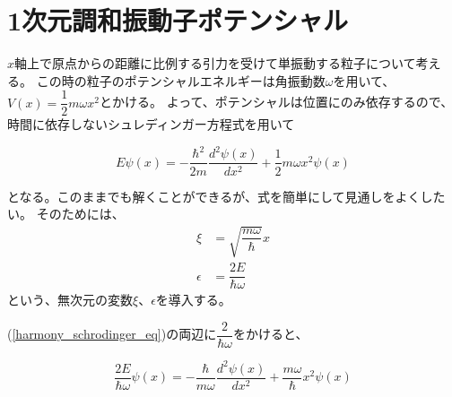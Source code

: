 
\section{1次元調和振動子ポテンシャル}
$x$軸上で原点からの距離に比例する引力を受けて単振動する粒子について考える。
この時の粒子のポテンシャルエネルギーは角振動数$\omega$を用いて、$V(x) = \dfrac{1}{2}m\omega x^2$とかける。
よって、ポテンシャルは位置にのみ依存するので、時間に依存しないシュレディンガー方程式を用いて

\begin{equation}
	\label{harmony_schrodinger_eq}
	E\psi(x) = - \dfrac{\hbar^2}{2m} \dfrac{d^2 \psi(x)}{d x^2} + \dfrac{1}{2}m\omega x^2\psi(x)
\end{equation}

となる。このままでも解くことができるが、式を簡単にして見通しをよくしたい。
そのためには、
\begin{align}
		\label{xi}
		\xi &= \sqrt{\dfrac{m\omega}{\hbar}}x \\
		\label{eps}
		\epsilon &= \dfrac{2E}{\hbar\omega}
\end{align}
という、無次元の変数$\xi$、$\epsilon$を導入する。

(\ref{harmony_schrodinger_eq})の両辺に$\dfrac{2}{\hbar\omega}$をかけると、

\begin{equation}
	\dfrac{2E}{\hbar\omega}\psi(x) = - \dfrac{\hbar}{m\omega} \dfrac{d^2 \psi(x)}{d x^2} + \dfrac{m\omega}{\hbar} x^2\psi(x)
\end{equation}

